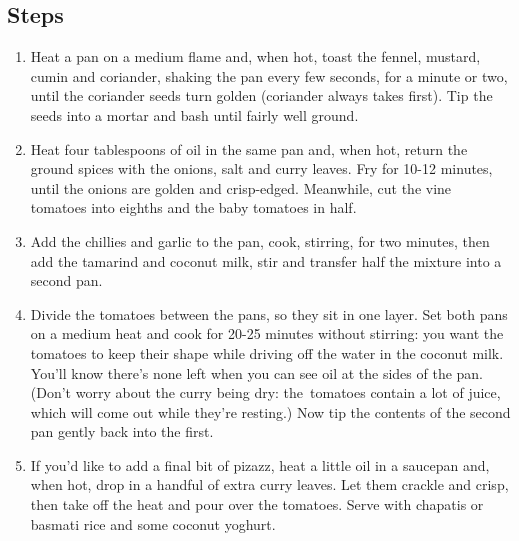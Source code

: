 \documentclass{book}
\begin{document}
\subsection*{Steps}
\begin{enumerate}
\item Heat a pan on a medium flame and, when hot, toast the fennel, mustard, cumin and coriander, shaking the pan every few seconds, for a minute or two, until the coriander seeds turn golden (coriander always takes first). Tip the seeds into a mortar and bash until fairly well ground.
\item Heat four tablespoons of oil in the same pan and, when hot, return the ground spices with the onions, salt and curry leaves. Fry for 10-12 minutes, until the onions are golden and crisp-edged. Meanwhile, cut the vine tomatoes into eighths and the baby tomatoes in half.
\item Add the chillies and garlic to the pan, cook, stirring, for two minutes, then add the tamarind and coconut milk, stir and transfer half the mixture into a second pan.
\item Divide the tomatoes between the pans, so they sit in one layer. Set both pans on a medium heat and cook for 20-25 minutes without stirring: you want the tomatoes to keep their shape while driving off the water in the coconut milk. You’ll know there’s none left when you can see oil at the sides of the pan. (Don’t worry about the curry being dry: the tomatoes contain a lot of juice, which will come out while they’re resting.) Now tip the contents of the second pan gently back into the first.
\item If you’d like to add a final bit of pizazz, heat a little oil in a saucepan and, when hot, drop in a handful of extra curry leaves. Let them crackle and crisp, then take off the heat and pour over the tomatoes. Serve with chapatis or basmati rice and some coconut yoghurt.
\end{enumerate}
\newpage
\end{document}
